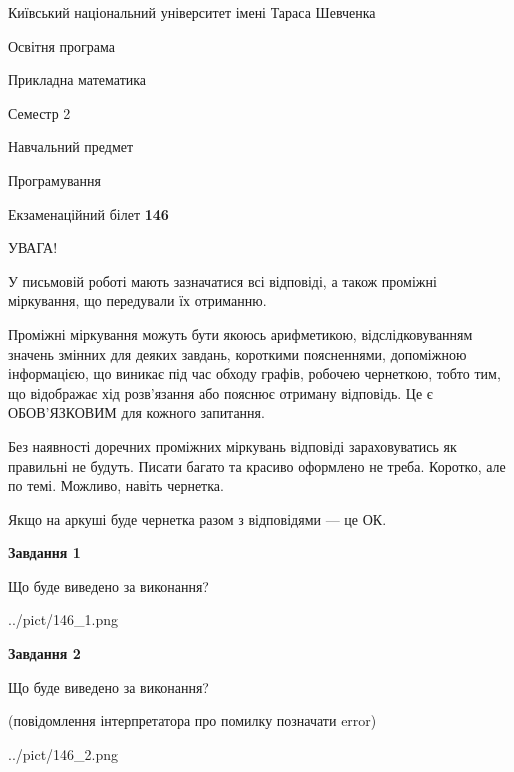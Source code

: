 \documentclass[12pt, ukrainian]{article}
\begin{document}
{{\begin {small}\par
{ \center  Київський національний університет імені Тараса Шевченка \par}
{\parbox {5 cm}{Освітня програма \hfill}{\parbox {7 cm}{Прикладна математика\hfill}}\parbox {6 cm}{\hfill Семестр 2}}\par
{\parbox {5 cm} {Навчальний предмет \hfill}\parbox {7 cm}{Програмування \hfill}\parbox {6cm}{\hfill}\par}\vspace{-7pt} \end{small}}{\center Екзаменаційний білет \No \textbf
{ 146 }\par}}
{
\begin {large}
УВАГА!

У письмовій роботі мають зазначатися всі відповіді, а також проміжні міркування, що передували їх отриманню.

Проміжні міркування можуть бути якоюсь арифметикою, відслідковуванням зна\-чень змінних для деяких завдань,
короткими поясненнями, допоміжною інформацією, що виникає під час обходу графів, робочею чернеткою,
тобто тим, що відображає хід розв’язання або пояснює отриману відповідь.
Це є ОБОВ’ЯЗКОВИМ для кожного запитання.

Без наявності доречних проміжних міркувань відповіді зараховуватись як правиль\-ні не будуть.
Писати багато та красиво оформлено не треба. Коротко, але по темі. Можли\-во, навіть чернетка.

Якщо на аркуші буде чернетка разом з відповідями --- це ОК.

\newpage

{\begin {center}\textbf{Завдання 1}\end {center}}\par
Що буде виведено за виконання?\par
\begin{center}
	{../pict/146_1.png}
\end{center}
\newpage

{\begin {center}\textbf{Завдання 2}\end {center}}\par
Що буде виведено за виконання?\par
 (повідомлення інтерпретатора про помилку позначати error)\par
\begin{center}
	{../pict/146_2.png}
\end{center}
\newpage


\end{large}}
\end{document}
